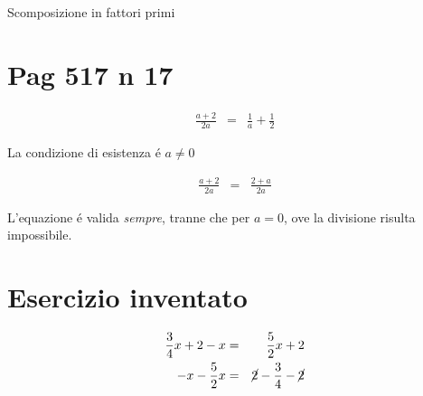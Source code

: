 \documentclass[17pt]{extarticle}
\begin{document}
Scomposizione in fattori primi

\section{Pag 517 n 17}

\begin{eqnarray}
	\frac{a+2}{2a} & = & \frac{1}{a} + \frac{1}{2}
\end{eqnarray}

La condizione di esistenza \'e $a \neq 0$

\begin{eqnarray}
	\frac{a+2}{2a} & = & \frac{2 + a}{2a}
\end{eqnarray}

L'equazione \'e valida \emph{sempre}, tranne che per $a=0$, ove la divisione risulta impossibile.

\section{Esercizio inventato}

\begin{eqnarray}
	\frac{3}{4}x + 2 - x & = & \frac{5}{2}x + 2\\
	-x - \frac{5}{2}x  & = & \cancel{2} - \frac{3}{4} - \cancel{2} 
\end{eqnarray}
\end{document}
